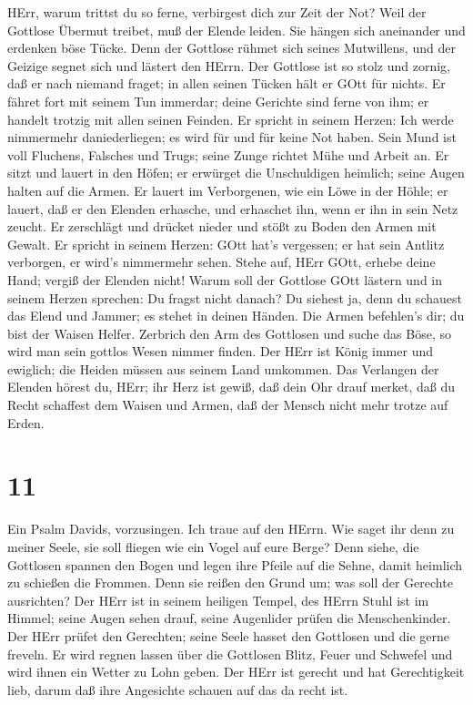  HErr, warum trittst du so ferne, verbirgest dich zur Zeit
der Not?  Weil der Gottlose Übermut treibet, muß der Elende
leiden. Sie hängen sich aneinander und erdenken böse Tücke. 
Denn der Gottlose rühmet sich seines Mutwillens, und der Geizige segnet
sich und lästert den HErrn.  Der Gottlose ist so stolz und
zornig, daß er nach niemand fraget; in allen seinen Tücken hält er GOtt
für nichts.  Er fähret fort mit seinem Tun immerdar; deine
Gerichte sind ferne von ihm; er handelt trotzig mit allen seinen
Feinden.  Er spricht in seinem Herzen: Ich werde nimmermehr
daniederliegen; es wird für und für keine Not haben.  Sein
Mund ist voll Fluchens, Falsches und Trugs; seine Zunge richtet Mühe und
Arbeit an.  Er sitzt und lauert in den Höfen; er erwürget
die Unschuldigen heimlich; seine Augen halten auf die Armen.
 Er lauert im Verborgenen, wie ein Löwe in der Höhle; er
lauert, daß er den Elenden erhasche, und erhaschet ihn, wenn er ihn in
sein Netz zeucht.  Er zerschlägt und drücket nieder und
stößt zu Boden den Armen mit Gewalt.  Er spricht in seinem
Herzen: GOtt hat's vergessen; er hat sein Antlitz verborgen, er wird's
nimmermehr sehen.  Stehe auf, HErr GOtt, erhebe deine Hand;
vergiß der Elenden nicht!  Warum soll der Gottlose GOtt
lästern und in seinem Herzen sprechen: Du fragst nicht danach?
 Du siehest ja, denn du schauest das Elend und Jammer; es
stehet in deinen Händen. Die Armen befehlen's dir; du bist der Waisen
Helfer.  Zerbrich den Arm des Gottlosen und suche das Böse,
so wird man sein gottlos Wesen nimmer finden.  Der HErr ist
König immer und ewiglich; die Heiden müssen aus seinem Land umkommen.
 Das Verlangen der Elenden hörest du, HErr; ihr Herz ist
gewiß, daß dein Ohr drauf merket,  daß du Recht schaffest
dem Waisen und Armen, daß der Mensch nicht mehr trotze auf Erden.

\hypertarget{section-10}{%
\section{11}\label{section-10}}

 Ein Psalm Davids, vorzusingen. Ich traue auf den HErrn. Wie
saget ihr denn zu meiner Seele, sie soll fliegen wie ein Vogel auf eure
Berge?  Denn siehe, die Gottlosen spannen den Bogen und
legen ihre Pfeile auf die Sehne, damit heimlich zu schießen die Frommen.
 Denn sie reißen den Grund um; was soll der Gerechte
ausrichten?  Der HErr ist in seinem heiligen Tempel, des
HErrn Stuhl ist im Himmel; seine Augen sehen drauf, seine Augenlider
prüfen die Menschenkinder.  Der HErr prüfet den Gerechten;
seine Seele hasset den Gottlosen und die gerne freveln.  Er
wird regnen lassen über die Gottlosen Blitz, Feuer und Schwefel und wird
ihnen ein Wetter zu Lohn geben.  Der HErr ist gerecht und
hat Gerechtigkeit lieb, darum daß ihre Angesichte schauen auf das da
recht ist.

